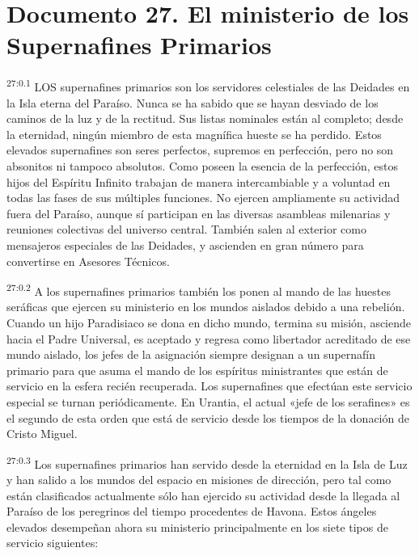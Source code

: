 \chapter{Documento 27. El ministerio de los Supernafines Primarios}
\par
\textsuperscript{27:0.1} LOS supernafines primarios son los servidores celestiales de las Deidades en la Isla eterna del Paraíso. Nunca se ha sabido que se hayan desviado de los caminos de la luz y de la rectitud. Sus listas nominales están al completo; desde la eternidad, ningún miembro de esta magnífica hueste se ha perdido. Estos elevados supernafines son seres perfectos, supremos en perfección, pero no son absonitos ni tampoco absolutos. Como poseen la esencia de la perfección, estos hijos del Espíritu Infinito trabajan de manera intercambiable y a voluntad en todas las fases de sus múltiples funciones. No ejercen ampliamente su actividad fuera del Paraíso, aunque sí participan en las diversas asambleas milenarias y reuniones colectivas del universo central. También salen al exterior como mensajeros especiales de las Deidades, y ascienden en gran número para convertirse en Asesores Técnicos.

\par
\textsuperscript{27:0.2} A los supernafines primarios también los ponen al mando de las huestes seráficas que ejercen su ministerio en los mundos aislados debido a una rebelión. Cuando un hijo Paradisiaco se dona en dicho mundo, termina su misión, asciende hacia el Padre Universal, es aceptado y regresa como libertador acreditado de ese mundo aislado, los jefes de la asignación siempre designan a un supernafín primario para que asuma el mando de los espíritus ministrantes que están de servicio en la esfera recién recuperada. Los supernafines que efectúan este servicio especial se turnan periódicamente. En Urantia, el actual «jefe de los serafines» es el segundo de esta orden que está de servicio desde los tiempos de la donación de Cristo Miguel.

\par
\textsuperscript{27:0.3} Los supernafines primarios han servido desde la eternidad en la Isla de Luz y han salido a los mundos del espacio en misiones de dirección, pero tal como están clasificados actualmente sólo han ejercido su actividad desde la llegada al Paraíso de los peregrinos del tiempo procedentes de Havona. Estos ángeles elevados desempeñan ahora su ministerio principalmente en los siete tipos de servicio siguientes:

